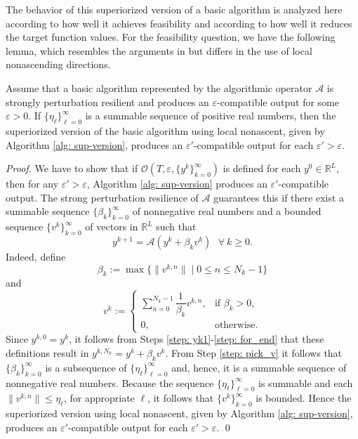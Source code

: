 \documentclass[smallextended]{svjour3}      %
\begin{document}
The behavior of this superiorized version of a basic algorithm is analyzed here according to how well it achieves feasibility and according to how well it reduces the target function values. For the feasibility question, we have the following lemma, which resembles the arguments in \cite[Subection II.E]{herman2012superiorization} but differs in the use of local nonascending directions.
\begin{lemma}
	\label{lem:epsilon-prime}Assume that a basic algorithm represented 	by the algorithmic operator $\mathcal{A}$ is strongly perturbation resilient and produces an $\varepsilon$-compatible output for some $\varepsilon>0$. If $\lbrace\eta_{\ell}\rbrace_{\ell=0}^{\infty}$ is a summable sequence of positive real numbers, then the superiorized version of the basic algorithm using local nonascent, given by Algorithm \ref{alg: sup-version}, produces an $\varepsilon'$-compatible output for each $\varepsilon'>\varepsilon$.
\end{lemma}
\begin{proof}
	We have to show that if $\mathcal{O}\left(T,\varepsilon,\{y^{k}\}_{k=0}^{\infty}\right)$  is defined for each $y^{0}\in\mathbb{R}^{L}$, then for any $\varepsilon'>\varepsilon$, Algorithm \ref{alg: sup-version} produces an $\varepsilon'$-compatible output. The strong perturbation resilience of $\mathcal{A}$ guarantees this if there exist a summable sequence $\{\beta_{k}\}_{k=0}^{\infty}$ of nonnegative real numbers and a bounded sequence $\{v^{k}\}_{k=0}^{\infty}$ of vectors in $\mathbb{R}^{L}$ such that 	
	\begin{equation}
	y^{k+1}=\mathcal{A}(y^{k}+\beta_{k}v^{k})\ \ \ \forall\ k\geq0.
	\end{equation}
	Indeed, define 	
	\begin{equation}
	\beta_{k}:=\max\{\|v^{k,n}\|\mid0\leq n\leq N_{k}-1\}\label{eq: beta_k}
	\end{equation}
	and	
	\begin{equation}
	v^{k}:=\begin{cases}
	\sum_{n=0}^{N_{k}-1}\dfrac{1}{\beta_{k}}v^{k,n}, & \mbox{if }\beta_{k}>0,\\
	0, & \mbox{otherwise.}
	\end{cases}\label{eq: v_k}
	\end{equation}
	Since $y^{k,0}=y^{k}$, it follows from Steps \ref{step: yk1}-\ref{step: for_end} that these definitions result in $y^{k,N_{k}}=y^{k}+\beta_{k}v^{k}.$
	From Step \ref{step: pick_v} it follows that $\{\beta_{k}\}_{k=0}^{\infty}$ 	is a subsequence of $\{\eta_{\ell}\}_{\ell=0}^{\infty}$ and, hence, it is a summable sequence of nonnegative real numbers. Because the sequence $\{\eta_{\ell}\}_{\ell=0}^{\infty}$ is summable and each $\|v^{k,n}\|\leq\eta_{\ell}$, for appropriate $\ell$, it follows that $\{v^{k}\}_{k=0}^{\infty}$ is bounded. Hence the superiorized version using local nonascent, given by Algorithm \ref{alg: sup-version}, produces an $\varepsilon'$-compatible output for each $\varepsilon'>\varepsilon$. \qed
\end{proof}
\end{document}
